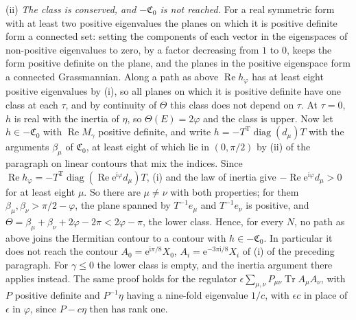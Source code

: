 (ii) \emph{The class is conserved, and \(-\mathfrak C_0\) is not reached.} For a real symmetric form with at least two positive eigenvalues the planes on which it is positive definite form a connected set: setting the components of each vector in the eigenspaces of non-positive eigenvalues to zero, by a factor decreasing from \(1\) to \(0\), keeps the form positive definite on the plane, and the planes in the positive eigenspace form a connected Grassmannian. Along a path as above \(\operatorname{Re}h_\varphi\) has at least eight positive eigenvalues by (i), so all planes on which it is positive definite have one class at each \(\tau\), and by continuity of \(\Theta\) this class does not depend on \(\tau\). At \(\tau=0\), \(h\) is real with the inertia of \(\eta\), so \(\Theta(E)=2\varphi\) and the class is upper. Now let \(h\in-\mathfrak C_0\) with \(\operatorname{Re}M_\gamma\) positive definite, and write \(h=-T^{\mathrm T}\operatorname{diag}(d_\mu)T\) with the arguments \(\beta_\mu\) of \(\mathfrak C_0\), at least eight of which lie in \((0,\pi/2)\) by (ii) of the paragraph on linear contours that mix the indices. Since \(\operatorname{Re}h_\varphi=-T^{\mathrm T}\operatorname{diag}(\operatorname{Re}\mathrm e^{\mathrm i\varphi}d_\mu)T\), (i) and the law of inertia give \(-\operatorname{Re}\mathrm e^{\mathrm i\varphi}d_\mu>0\) for at least eight \(\mu\). So there are \(\mu\neq\nu\) with both properties; for them \(\beta_\mu,\beta_\nu>\pi/2-\varphi\), the plane spanned by \(T^{-1}e_\mu\) and \(T^{-1}e_\nu\) is positive, and \(\Theta=\beta_\mu+\beta_\nu+2\varphi-2\pi<2\varphi-\pi\), the lower class. Hence, for every \(N\), no path as above joins the Hermitian contour to a contour with \(h\in-\mathfrak C_0\). In particular it does not reach the contour \(A_0=\mathrm e^{\mathrm i\pi/8}X_0\), \(A_i=\mathrm e^{-3\pi\mathrm i/8}X_i\) of (i) of the preceding paragraph. For \(\gamma\le0\) the lower class is empty, and the inertia argument there applies instead. The same proof holds for the regulator \(\epsilon\sum_{\mu,\nu}P_{\mu\nu}\operatorname{Tr}A_\mu A_\nu\), with \(P\) positive definite and \(P^{-1}\eta\) having a nine-fold eigenvalue \(1/c\), with \(\epsilon c\) in place of \(\epsilon\) in \(\varphi\), since \(P-c\eta\) then has rank one.

